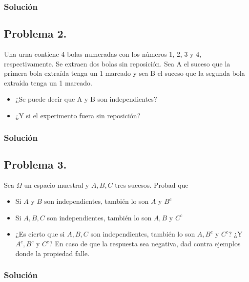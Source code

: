 \documentclass[
]{article}
\providecommand{\tightlist}{%
  \setlength{\itemsep}{0pt}\setlength{\parskip}{0pt}}
\begin{document}
\hypertarget{soluciuxf3n-17}{%
\subsubsection{Solución}\label{soluciuxf3n-17}}

\hypertarget{problema-2.}{%
\subsection{Problema 2.}\label{problema-2.}}

Una urna contiene 4 bolas numeradas con los números 1, 2, 3 y 4,
respectivamente. Se extraen dos bolas sin reposición. Sea A el suceso
que la primera bola extraída tenga un 1 marcado y sea B el suceso que la
segunda bola extraída tenga un 1 marcado.

\begin{itemize}
\tightlist
\item
  ¿Se puede decir que A y B son independientes?
\item
  ¿Y si el experimento fuera sin reposición?
\end{itemize}

\hypertarget{soluciuxf3n-18}{%
\subsubsection{Solución}\label{soluciuxf3n-18}}

\hypertarget{problema-3.}{%
\subsection{Problema 3.}\label{problema-3.}}

Sea \(\Omega\) un espacio muestral y \(A,B,C\) tres sucesos. Probad que

\begin{itemize}
\tightlist
\item
  Si \(A\) y \(B\) son independientes, también lo son \(A\) y \(B^c\)
\item
  Si \(A,B,C\) son independientes, también lo son \(A,B\) y \(C^c\)
\item
  ¿Es cierto que si \(A,B,C\) son independientes, también lo son
  \(A,B^c\) y \(C^c\)? ¿Y \(A^c, B^c\) y \(C^c\)? En caso de que la
  respuesta sea negativa, dad contra ejemplos donde la propiedad falle.
\end{itemize}

\hypertarget{soluciuxf3n-19}{%
\subsubsection{Solución}\label{soluciuxf3n-19}}
\end{document}
